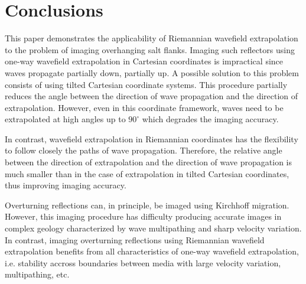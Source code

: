 \section{Conclusions}
This paper demonstrates the applicability of Riemannian wavefield extrapolation to the problem of imaging overhanging salt flanks. Imaging such reflectors using one-way wavefield extrapolation in Cartesian coordinates is impractical since waves propagate partially down, partially up. A possible solution to this problem consists of using tilted Cartesian coordinate systems. This procedure partially reduces the angle between the direction of wave propagation and the direction of extrapolation. However, even in this coordinate framework, waves need to be extrapolated at high angles up to $90^\circ$ which degrades the imaging accuracy.
\par
In contrast, wavefield extrapolation in Riemannian coordinates has the flexibility to follow closely the paths of wave propagation. Therefore, the relative angle between the direction of extrapolation and the direction of wave propagation is much smaller than in the case of extrapolation in tilted Cartesian coordinates, thus improving imaging accuracy.
\par
Overturning reflections can, in principle, be imaged using Kirchhoff migration. However, this imaging procedure has difficulty producing accurate images in complex geology characterized by wave multipathing and sharp velocity variation. In contrast, imaging overturning reflections using Riemannian wavefield extrapolation benefits from all characteristics of one-way wavefield extrapolation, i.e. stability accross boundaries between media with large velocity variation, multipathing, etc. 

